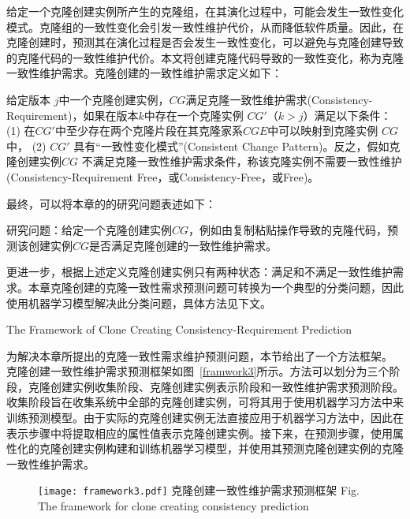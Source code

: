 给定一个克隆创建实例所产生的克隆组，在其演化过程中，可能会发生一致性变化模式。克隆组的一致性变化会引发一致性维护代价，从而降低软件质量。因此，在克隆创建时，预测其在演化过程是否会发生一致性变化，可以避免与克隆创建导致的克隆代码的一致性维护代价。本文将创建克隆代码导致的一致性变化，称为克隆一致性维护需求。克隆创建的一致性维护需求定义如下：

\begin{definition}[创建一致性维护需求] 
 \label{def-creatingrequirement}
给定版本 $j$中一个克隆创建实例，$CG$满足克隆一致性维护需求(Consistency-Requirement)，如果在版本$k$中存在一个克隆实例 $CG'$（$k>j$）满足以下条件： (1) 在$CG'$中至少存在两个克隆片段在其克隆家系$CGE$中可以映射到克隆实例 $CG$中， (2) $CG'$ 具有“一致性变化模式”(Consistent Change Pattern)。反之，假如克隆创建实例$CG$ 不满足克隆一致性维护需求条件，称该克隆实例不需要一致性维护(Consistency-Requirement Free，或Consistency-Free，或Free)。
\end{definition}

最终，可以将本章的的研究问题表述如下：

研究问题：给定一个克隆创建实例$CG$，例如由复制粘贴操作导致的克隆代码，预测该创建实例$CG$是否满足克隆创建的一致性维护需求。

更进一步，根据上述定义克隆创建实例只有两种状态：满足和不满足一致性维护需求。本章克隆创建的克隆一致性需求预测问题可转换为一个典型的分类问题，因此使用机器学习模型解决此分类问题，具体方法见下文。

{The Framework of Clone Creating Consistency-Requirement Prediction }

为解决本章所提出的克隆一致性需求维护预测问题，本节给出了一个方法框架。
克隆创建一致性维护需求预测框架如图~\ref{framwork3}所示。方法可以划分为三个阶段，克隆创建实例收集阶段、克隆创建实例表示阶段和一致性维护需求预测阶段。收集阶段旨在收集系统中全部的克隆创建实例，可将其用于使用机器学习方法中来训练预测模型。由于实际的克隆创建实例无法直接应用于机器学习方法中，因此在表示步骤中将提取相应的属性值表示克隆创建实例。接下来，在预测步骤，使用属性化的克隆创建实例构建和训练机器学习模型，并使用其预测克隆创建实例的克隆一致性维护需求。

\begin{figure}[htbp]
\centering
\texttt{[image: framework3.pdf]}
\bicaption[framwork3]{}
{克隆创建一致性维护需求预测框架}
{Fig.$\!$}{The framework for clone creating consistency prediction}
\vspace{-1em}
\end{figure}


